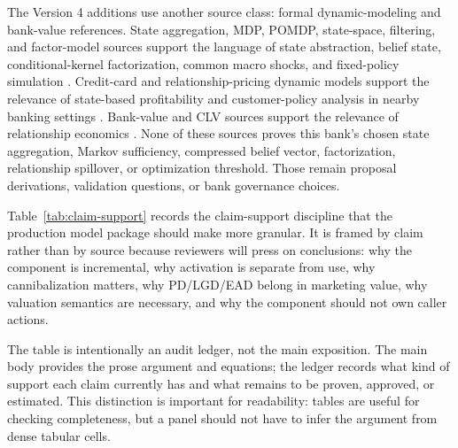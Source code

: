\documentclass[11pt]{article}
\newcommand{\1}{\mathbf{1}}
\begin{document}
The Version 4 additions use another source class: formal dynamic-modeling and
bank-value references. State aggregation, MDP, POMDP, state-space, filtering,
and factor-model sources support the language of state abstraction, belief
state, conditional-kernel factorization, common macro shocks, and fixed-policy
simulation \citep{bean1987aggregation,puterman1994mdp,smallwood1973pomdp,
kaelbling1998pomdp,durbinkoopman2012ssm,westharrison1997bfdm,doucet2001smc,
ledoux2005recursivefilters,bernankeboivin2003datarich,
bernankeboivineliasz2005favar,stockwatson2005factorvar}. Credit-card and
relationship-pricing dynamic models support the relevance of state-based
profitability and customer-policy analysis in nearby banking settings
\citep{thomas2011creditcardmdp,lewis2005relationshippricing}. Bank-value and
CLV sources support the relevance of relationship economics
\citep{egan2022bankvalue,berger1998clv,rust2004return,venkatesan2004clv}.
None of these sources proves this bank's chosen state aggregation, Markov
sufficiency, compressed belief vector, factorization, relationship spillover,
or optimization threshold. Those remain proposal derivations, validation
questions, or bank governance choices.

Table~\ref{tab:claim-support} records the claim-support discipline that the
production model package should make more granular. It is framed by claim
rather than by source because reviewers will press on conclusions: why the
component is incremental, why activation is separate from use, why
cannibalization matters, why PD/LGD/EAD belong in marketing value, why
valuation semantics are necessary, and why the component should not own caller
actions.

The table is intentionally an audit ledger, not the main exposition. The main
body provides the prose argument and equations; the ledger records what kind
of support each claim currently has and what remains to be proven, approved,
or estimated. This distinction is important for readability: tables are useful
for checking completeness, but a panel should not have to infer the argument
from dense tabular cells.
\end{document}
